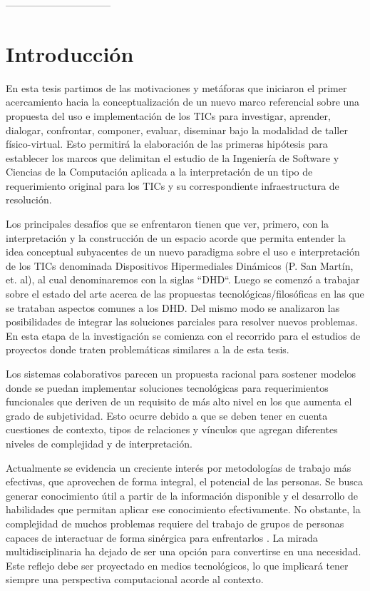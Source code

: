--------------------------------
\parskip=0.6cm

\chapter{Introducción}\label{cap:1}


En esta tesis partimos de las motivaciones y metáforas que
iniciaron el primer acercamiento hacia la conceptualización de un nuevo marco
referencial sobre una propuesta del uso e implementación de los TICs para
investigar, aprender, dialogar, confrontar, componer, evaluar, diseminar bajo la
modalidad de taller físico-virtual. Esto permitirá la elaboración de las
primeras hipótesis para establecer los marcos que delimitan el estudio de la
Ingeniería de Software y Ciencias de la Computación aplicada a la interpretación
de un tipo de requerimiento original para los TICs y su correspondiente
infraestructura de resolución.


Los principales desafíos que se enfrentaron tienen que ver, primero, con
la interpretación y la construcción de un espacio acorde que permita entender
la idea conceptual subyacentes de un nuevo paradigma sobre el uso e
interpretación de los TICs denominada Dispositivos Hipermediales Dinámicos
(P. San Martín, et. al), al cual denominaremos con la siglas ``DHD``. Luego
se comenzó a trabajar sobre el estado del arte acerca de las propuestas
tecnológicas/filosóficas en las que se trataban aspectos comunes a los DHD. Del
mismo modo se analizaron las posibilidades de integrar las soluciones parciales
para resolver nuevos problemas. En esta etapa de la investigación se comienza
con el recorrido para el estudios de proyectos donde traten problemáticas
similares a la de esta tesis.

Los sistemas colaborativos parecen un propuesta racional para sostener modelos
donde se puedan implementar soluciones tecnológicas para requerimientos
funcionales que deriven de un requisito de más alto nivel en los que aumenta
el grado de subjetividad. Esto ocurre  debido a que se deben tener en cuenta
cuestiones de contexto, tipos de relaciones y vínculos que agregan diferentes
niveles de complejidad y de interpretación. 

Actualmente se evidencia un creciente
interés por metodologías de trabajo más
efectivas, que aprovechen de forma
integral, el potencial de las personas. Se
busca generar conocimiento útil a partir de
la información disponible y el desarrollo de
habilidades que permitan aplicar ese
conocimiento efectivamente. No obstante,
la complejidad de muchos problemas
requiere del trabajo de grupos de
personas capaces de interactuar de forma
sinérgica para enfrentarlos \cite{cap1.1}. La mirada
multidisciplinaria ha dejado de ser una
opción para convertirse en una necesidad. Este reflejo debe ser proyectado en
medios tecnológicos, lo que implicará tener siempre una perspectiva
computacional acorde al contexto. 

